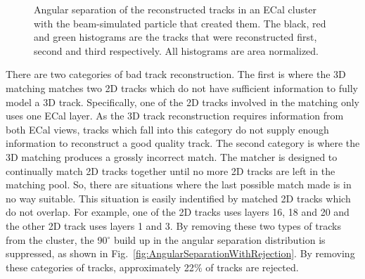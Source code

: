\begin{figure}%
  \centering
  \caption{Angular separation of the reconstructed tracks in an ECal cluster with the beam-simulated particle that created them.  The black, red and green histograms are the tracks that were reconstructed first, second and third respectively.  All histograms are area normalized.}
  \label{fig:TrackRejectionAngularSeparation}
\end{figure}
There are two categories of bad track reconstruction.  The first is where the 3D matching matches two 2D tracks which do not have sufficient information to fully model a 3D track.  Specifically, one of the 2D tracks involved in the matching only uses one ECal layer.  As the 3D track reconstruction requires information from both ECal views, tracks which fall into this category do not supply enough information to reconstruct a good quality track.  The second category is where the 3D matching produces a grossly incorrect match.  The matcher is designed to continually match 2D tracks together until no more 2D tracks are left in the matching pool.  So, there are situations where the last possible match made is in no way suitable.  This situation is easily indentified by matched 2D tracks which do not overlap.  For example, one of the 2D tracks uses layers 16, 18 and 20 and the other 2D track uses layers 1 and 3.  By removing these two types of tracks from the cluster, the 90$^\circ$ build up in the angular separation distribution is suppressed, as shown in Fig.~\ref{fig:AngularSeparationWithRejection}.  By removing these categories of tracks, approximately 22$\%$ of tracks are rejected.
